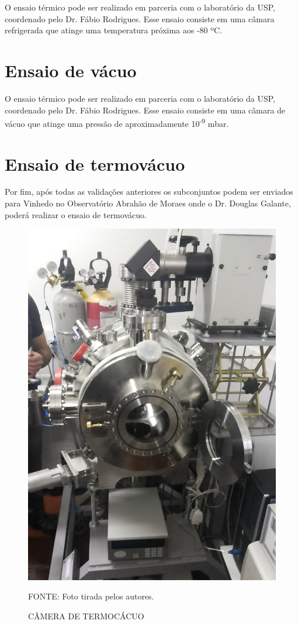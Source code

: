 \documentclass[
	12pt,				%
	openright,			%
	oneside,			%
	a4paper,			%
	english,			%
	french,				%
	spanish,			%
	brazil,				%
	oldfontcommands
	]{abntex2}
\begin{document}
\begin{apendicesenv}
	O ensaio térmico pode ser realizado em parceria com o laboratório da USP, coordenado pelo Dr. Fábio Rodrigues. Esse ensaio consiste em uma câmara refrigerada que atinge uma temperatura próxima aos -80 ºC. 

\section[Ensaio de vácuo]{Ensaio de vácuo}	

	O ensaio térmico pode ser realizado em parceria com o laboratório da USP, coordenado pelo Dr. Fábio Rodrigues. Esse ensaio consiste em uma câmara de vácuo que atinge uma pressão de aproximadamente 10\textsuperscript{-9} mbar. 
	
\section[Ensaio de termovácuo]{Ensaio de termovácuo}

	Por fim, após todas as validações anteriores os subconjuntos podem ser enviados para Vinhedo no Observatório Abrahão de Moraes onde o Dr. Douglas Galante, poderá realizar o ensaio de termovácuo.
	
	\begin{figure}[th]
		\caption{CÂMERA DE TERMOCÁCUO}
		\label{Fig_SubConj}
		\centering
		\includegraphics[width=0.5\linewidth]{./figs/termovacuo}
			
		\begin{small}
			FONTE: Foto tirada pelos autores.
		\end{small}		
	\end{figure}
	\pagebreak
	

\end{apendicesenv}
\end{document}
